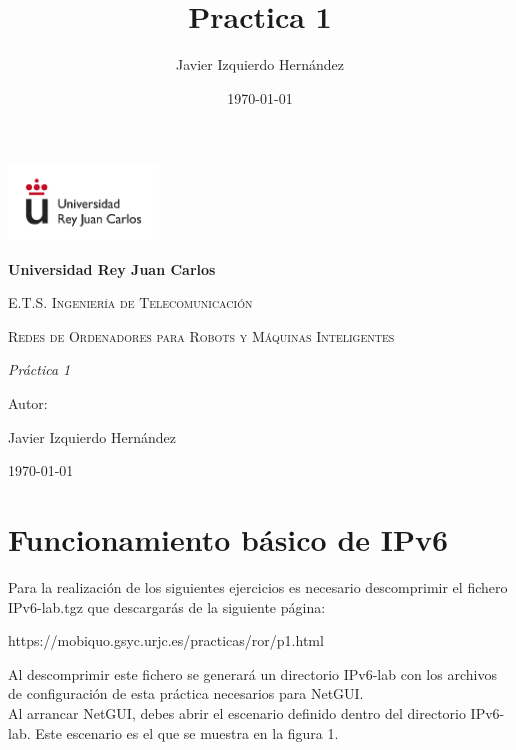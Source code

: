 \documentclass[12pt, a4paper]{report}
\title{Practica 1}
\author{Javier Izquierdo Hernández}
\date{\today}
\begin{document}
	\begin{titlepage}
		\centering
		{\includegraphics[width=0.3\textwidth]{logo}\par}
		\vspace{1cm}
		{\bfseries\LARGE Universidad Rey Juan Carlos \par}
		\vspace{1cm}
		{\scshape\Large E.T.S. Ingeniería de Telecomunicación \par}
		\vspace{3cm}
		{\scshape\Huge Redes de Ordenadores para Robots y Máquinas Inteligentes \par}
		\vspace{3cm}
		{\itshape\Large Práctica 1 \par}
		\vfill
		{\Large Autor: \par}
		{\Large Javier Izquierdo Hernández \par}
		\vfill
		{\Large \today \par}
	\end{titlepage}

\newpage
\renewcommand{\contentsname}{Contenidos}
\tableofcontents
\newpage

\chapter{Funcionamiento básico de IPv6}
Para la realización de los siguientes ejercicios es necesario descomprimir el fichero IPv6-lab.tgz
que descargarás de la siguiente página:
\begin{center}
https://mobiquo.gsyc.urjc.es/practicas/ror/p1.html\\	
\end{center}
Al descomprimir este fichero se generará un directorio IPv6-lab con los archivos de configuración
de esta práctica necesarios para NetGUI.\\

Al arrancar NetGUI, debes abrir el escenario definido dentro del directorio IPv6-lab. Este
escenario es el que se muestra en la figura 1.
\end{document}
